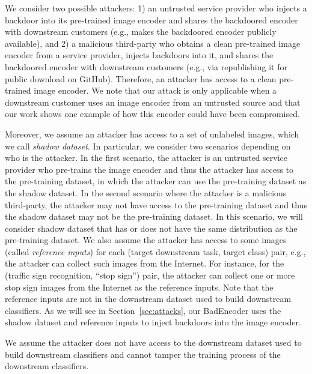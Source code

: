   We consider two possible attackers: 1) an untrusted service provider who  injects a backdoor into its pre-trained image encoder and shares the backdoored  encoder with downstream customers (e.g., makes the backdoored  encoder publicly available), and 2) a malicious third-party  who obtains a clean pre-trained image encoder from a service provider, injects backdoors into it, and shares the backdoored encoder with downstream customers (e.g., via republishing it for public download  on GitHub). Therefore, an attacker has access to a clean pre-trained image encoder.  We note that our attack is only applicable when a downstream customer uses an image encoder from an untrusted source and that our work shows one example of how this encoder could have been compromised.

Moreover, we assume an attacker has access to a set of unlabeled images, which we call \emph{shadow dataset}.  
In particular, we consider two scenarios depending on who is the attacker. In the first scenario,  the attacker is an untrusted service provider who pre-trains the image encoder and thus the attacker has access to the pre-training dataset, in which the attacker can use the pre-training dataset  as the shadow dataset.  In the second scenario where the attacker is a malicious third-party, the attacker may not have access to the pre-training dataset and thus the shadow dataset may not be the pre-training dataset. In this scenario, we will consider  shadow dataset that has or does not have the same distribution as the pre-training dataset. We also assume the attacker has access to some images (called \emph{reference inputs}) for each (target downstream task, target class) pair, e.g., the attacker can collect such images from the Internet. For instance, for the (traffic sign recognition, ``stop sign'') pair, the attacker can collect one or more stop sign images from the Internet as the reference inputs. Note that the reference inputs are not in the downstream dataset used to build downstream classifiers.  As we will see in Section~\ref{sec:attacks}, our BadEncoder uses the shadow dataset and reference inputs to inject backdoors into the image encoder.


We assume the attacker does not have access to the downstream dataset used to build downstream classifiers and cannot tamper the training process of the downstream classifiers. 


 